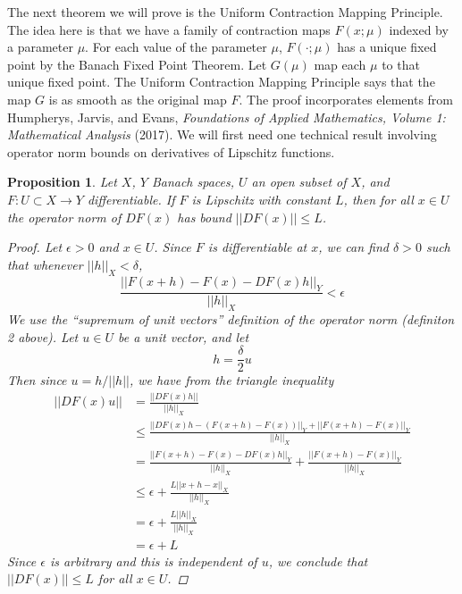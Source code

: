 \documentclass[12pt]{amsart}         %
\newtheorem{proposition}{Proposition}[section]
\theoremstyle{remark}
\begin{document}
The next theorem we will prove is the Uniform Contraction Mapping Principle. The idea here is that we have a family of contraction maps $F(x; \mu)$ indexed by a parameter $\mu$. For each value of the parameter $\mu$, $F(\cdot; \mu)$ has a unique fixed point by the Banach Fixed Point Theorem. Let $G(\mu)$ map each $\mu$ to that unique fixed point. The Uniform Contraction Mapping Principle says that the map $G$ is as smooth as the original map $F$. The proof incorporates elements from Humpherys, Jarvis, and Evans, \emph{Foundations of Applied Mathematics, Volume 1: Mathematical Analysis} (2017). We will first need one technical result involving operator norm bounds on derivatives of Lipschitz functions. 

\begin{proposition}
Let $X$, $Y$ Banach spaces, $U$ an open subset of $X$, and $F: U \subset X \rightarrow Y$ differentiable. If $F$ is Lipschitz with constant $L$, then for all $x \in U$ the operator norm of $DF(x)$ has bound $||DF(x)|| \leq L$.
\begin{proof}
Let $\epsilon > 0$ and $x \in U$. Since $F$ is differentiable at $x$, we can find $\delta > 0$ such that whenever $||h||_X < \delta$,
\[
\frac{||F(x+h) - F(x) - DF(x)h||_Y}{||h||_X} < \epsilon
\]
We use the ``supremum of unit vectors'' definition of the operator norm (definiton 2 above). Let $u \in U$ be a unit vector, and let
\[
h = \frac{\delta}{2}u
\]
Then since $u = h/||h||$, we have from the triangle inequality
\begin{align*}
||DF(x)u|| &= \frac{||DF(x)h||}{||h||_X} \\
&\leq \frac{||DF(x)h - (F(x+h) - F(x))||_Y + ||F(x+h) - F(x)||_Y }{||h||_X} \\
&= \frac{||F(x+h) - F(x) - DF(x)h||_Y }{||h||_X} + \frac{||F(x+h) - F(x)||_Y }{||h||_X} \\
&\leq \epsilon + \frac{L||x + h - x||_X}{||h||_X} \\
&= \epsilon + \frac{L||h||_X}{||h||_X} \\
&= \epsilon + L
\end{align*}
Since $\epsilon$ is arbitrary and this is independent of $u$, we conclude that $||DF(x)|| \leq L$ for all $x \in U$.
\end{proof}
\end{proposition}
\end{document}
